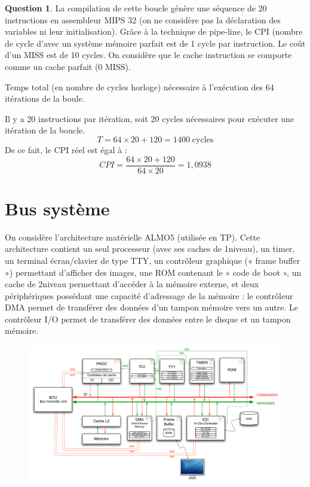 \documentclass[11pt,english,french]{scrreprt}
\theoremstyle{remark}
\theoremstyle{definition}
\newtheorem{ques}{Question}[section]
\begin{document}
\begin{ques}
	 La compilation de cette boucle génère une séquence de 20 instructions en assembleur MIPS 32 (on ne considère pas la déclaration des variables ni leur initialisation). Grâce à la technique de pipe-line, le CPI (nombre de cycle d'avec un système mémoire parfait est de 1 cycle par instruction. Le coût d'un MISS est de 10 cycles. On considère que le cache instruction se comporte comme un cache parfait (0 MISS).
	
	Temps total (en nombre de cycles horloge) nécessaire à l'exécution des 64 itérations de la boule.
	
	Il y a 20 instructions par itération, soit 20 cycles nécessaires pour exécuter une itération de la boucle.
	\[ T = 64\times 20+120 =  1400\;\mathrm{cycles}\]
	De ce fait, le CPI réel est égal à :\[CPI = \frac{64\times 20 + 120}{64\times 20} = 1,0938\]
\end{ques}

\clearpage

\section{Bus système} %

On considère l’architecture matérielle ALMO5 (utilisée en TP). Cette architecture contient un seul processeur (avec ses caches de 1\ier niveau), un timer, un terminal écran/clavier de type TTY, un contrôleur graphique (« frame buffer ») permettant d’afficher des images, une ROM contenant le « code de boot », un cache de 2\ieme niveau permettant d’accéder à la mémoire externe, et deux périphériques possédant une capacité d’adressage de la mémoire : le contrôleur DMA permet de transférer des données d’un tampon mémoire vers un autre. Le contrôleur I/O permet de transférer des données entre le disque et un tampon mémoire.

\begin{figure}[h]
	\center
	\includegraphics[scale=.5]{diagrammes/architecture-finale}
\end{figure}
\end{document}
